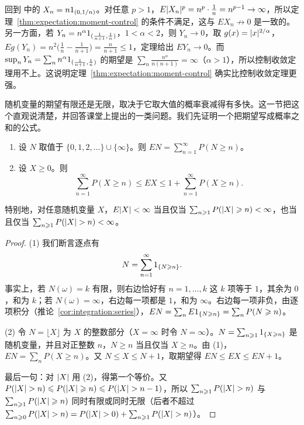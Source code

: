 \begin{example}
回到 中的 $X_n=n1_{(0,1/n)}$。对任意 $p>1$，$E\lvert X_n\rvert^p=n^p\cdot\frac1n=n^{p-1}\to\infty$，所以定理~\ref{thm:expectation:moment-control} 的条件不满足，这与 $EX_n\not\to0$ 是一致的。另一方面，若 $Y_n=n^\alpha1_{(\frac1{n+1},\frac1n)}$，$1<\alpha<2$，则 $Y_n\to0$，取 $g(x)=\lvert x\rvert^{2/\alpha}$，$Eg(Y_n)=n^2\bigl(\frac1n-\frac1{n+1}\bigr)=\frac n{n+1}\leqslant1$，定理给出 $EY_n\to0$。而 $\sup_nY_n=\sum_nn^\alpha1_{(\frac1{n+1},\frac1n)}$ 的期望是 $\sum_n\frac{n^\alpha}{n(n+1)}=\infty$（$\alpha>1$），所以控制收敛定理用不上。这说明定理~\ref{thm:expectation:moment-control} 确实比控制收敛定理更强。
\end{example}


随机变量的期望有限还是无限，取决于它取大值的概率衰减得有多快。这一节把这个直观说清楚，并回答课堂上提出的一类问题。我们先证明一个把期望写成概率之和的公式。

\begin{proposition}[期望与尾概率之和]\label{prop:expectation:tail-sum}
\begin{enumerate}
\item 设 $N$ 取值于 $\{0,1,2,\dots\}\cup\{\infty\}$。则 $EN=\sum_{n=1}^\infty P(N\geqslant n)$。
\item 设 $X\geqslant0$。则
\[
\sum_{n=1}^\infty P(X\geqslant n)\leqslant EX\leqslant1+\sum_{n=1}^\infty P(X\geqslant n).
\]
\end{enumerate}
特别地，对任意随机变量 $X$，$E\lvert X\rvert<\infty$ 当且仅当 $\sum_{n\geqslant1}P(\lvert X\rvert\geqslant n)<\infty$，也当且仅当 $\sum_{n\geqslant1}P(\lvert X\rvert>n)<\infty$。
\end{proposition}
\begin{proof}
(1) 我们断言逐点有
\[
N=\sum_{n=1}^\infty1_{\{N\geqslant n\}}.
\]
事实上，若 $N(\omega)=k$ 有限，则右边恰好有 $n=1,\dots,k$ 这 $k$ 项等于 $1$，其余为 $0$，和为 $k$；若 $N(\omega)=\infty$，右边每一项都是 $1$，和为 $\infty$。右边每一项非负，由逐项积分（推论~\ref{cor:integration:series}），$EN=\sum_nE1_{\{N\geqslant n\}}=\sum_nP(N\geqslant n)$。

(2) 令 $N=\lfloor X\rfloor$ 为 $X$ 的整数部分（$X=\infty$ 时令 $N=\infty$）。$N=\sum_{n\geqslant1}1_{\{X\geqslant n\}}$ 是随机变量，并且对正整数 $n$，$N\geqslant n$ 当且仅当 $X\geqslant n$。由 (1)，$EN=\sum_nP(X\geqslant n)$。又 $N\leqslant X\leqslant N+1$，取期望得 $EN\leqslant EX\leqslant EN+1$。

最后一句：对 $\lvert X\rvert$ 用 (2)，得第一个等价。又 $P(\lvert X\rvert>n)\leqslant P(\lvert X\rvert\geqslant n)\leqslant P(\lvert X\rvert>n-1)$，所以 $\sum_{n\geqslant1}P(\lvert X\rvert>n)$ 与 $\sum_{n\geqslant1}P(\lvert X\rvert\geqslant n)$ 同时有限或同时无限（后者不超过 $\sum_{n\geqslant0}P(\lvert X\rvert>n)=P(\lvert X\rvert>0)+\sum_{n\geqslant1}P(\lvert X\rvert>n)$）。
\end{proof}

